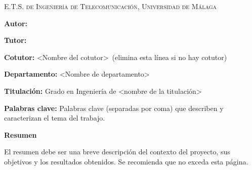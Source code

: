 
\pagestyle{fancy}
\renewcommand{\headrulewidth}{0pt}

\begin{center}
	\scshape
	E.T.S. de Ingeniería de Telecomunicación, Universidad de Málaga
\end{center}

\bigskip

\begin{center}
	\Large \scshape
	\textbf{\tfgtitlename}
\end{center}

\bigskip \bigskip \bigskip

\begin{minipage}{\textwidth}

\textbf{Autor:} \tfgauthorname

\medskip

\textbf{Tutor:} \tfgtutorname

\medskip

\textbf{Cotutor:} <Nombre del cotutor>\ (elimina esta línea si no hay cotutor)

\medskip

\textbf{Departamento:} <Nombre de departamento>

\medskip

\textbf{Titulación:} Grado en Ingeniería de <nombre de la titulación>

\medskip

\textbf{Palabras clave:} Palabras clave (separadas por coma) que describen y caracterizan el tema del trabajo.

\bigskip \bigskip


\end{minipage}

\begin{center}
	\textbf{Resumen}
\end{center}

El resumen debe ser una breve descripción del contexto del proyecto,
sus objetivos y los resultados obtenidos. Se recomienda que no exceda
esta página.

\blankpage